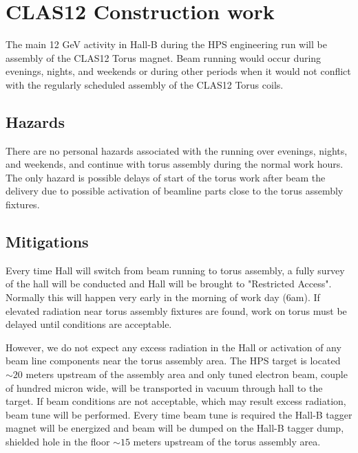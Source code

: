 \graphicspath{{hps/figs/}}
\renewcommand{\dirfig}[0]{hps/figs}
\renewcommand{\dircur}[0]{hps}









\section{CLAS12 Construction work}
\indent

The main 12 GeV activity in Hall-B during the HPS engineering run will be assembly of the CLAS12 Torus magnet. Beam running would occur during evenings, nights, and weekends or during other periods when it would not conflict with the regularly scheduled assembly of the CLAS12 Torus coils.

\subsection{Hazards} 
\indent

There are no personal hazards associated with the running over evenings, nights, and weekends, and continue with torus assembly during the normal work hours. The only hazard is possible delays of start of the torus work after beam the delivery due to possible activation of beamline parts close to the torus assembly fixtures.
 
\subsection{Mitigations}
\indent

Every time Hall will switch from beam running to torus assembly, a fully survey of the hall will be conducted and Hall will be brought to "Restricted Access". Normally this will happen very early in the morning of work day (6am). If elevated radiation near torus assembly fixtures are found, work on torus must be delayed until conditions are acceptable. 

However, we do not expect any excess radiation in the Hall or activation of any beam line components near the torus assembly area. The HPS  target is located $\sim20$ meters upstream of the assembly area and only tuned electron beam, couple of hundred micron wide, will be transported in vacuum through hall to the target. If beam conditions are not acceptable, which may result excess radiation, beam tune will be performed. Every time beam tune is required the Hall-B tagger magnet will be energized and beam will be dumped on the Hall-B tagger dump, shielded hole in the floor $\sim 15$ meters upstream of the torus assembly area. 

